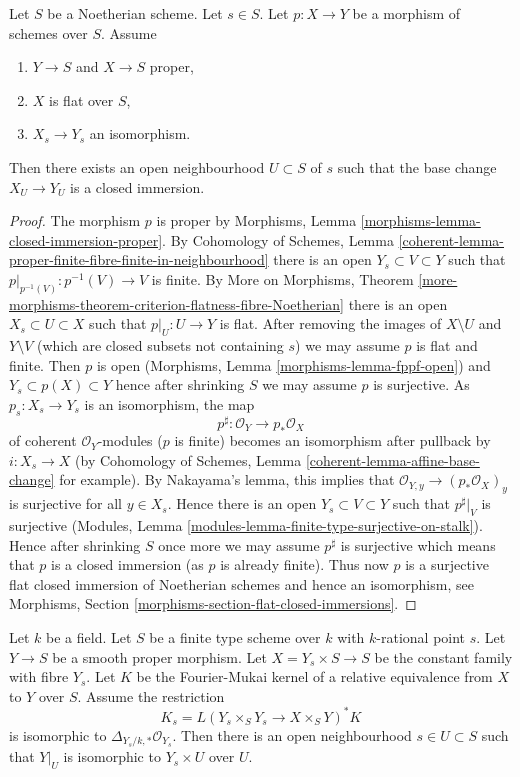 \begin{lemma}
\label{lemma-isomorphism-in-neighbourhood}
Let $S$ be a Noetherian scheme. Let $s \in S$.
Let $p : X \to Y$ be a morphism of schemes over $S$.
Assume
\begin{enumerate}
\item $Y \to S$ and $X \to S$ proper,
\item $X$ is flat over $S$,
\item $X_s \to Y_s$ an isomorphism.
\end{enumerate}
Then there exists an open neighbourhood $U \subset S$ of $s$
such that the base change $X_U \to Y_U$ is a closed immersion.
\end{lemma}

\begin{proof}
The morphism $p$ is proper by Morphisms, Lemma
\ref{morphisms-lemma-closed-immersion-proper}.
By Cohomology of Schemes, Lemma
\ref{coherent-lemma-proper-finite-fibre-finite-in-neighbourhood}
there is an open $Y_s \subset V \subset Y$ such that
$p|_{p^{-1}(V)} : p^{-1}(V) \to V$ is finite.
By More on Morphisms, Theorem
\ref{more-morphisms-theorem-criterion-flatness-fibre-Noetherian}
there is an open $X_s \subset U \subset X$ such that
$p|_U : U \to Y$ is flat. After removing the images of
$X \setminus U$ and $Y \setminus V$ (which are closed subsets
not containing $s$) we may assume $p$ is flat and finite.
Then $p$ is open (Morphisms, Lemma \ref{morphisms-lemma-fppf-open})
and $Y_s \subset p(X) \subset Y$ hence after shrinking $S$
we may assume $p$ is surjective.
As $p_s : X_s \to Y_s$ is an isomorphism, the map
$$
p^\sharp : \mathcal{O}_Y \longrightarrow p_*\mathcal{O}_X
$$
of coherent $\mathcal{O}_Y$-modules ($p$ is finite)
becomes an isomorphism after pullback by $i : X_s \to X$
(by Cohomology of Schemes, Lemma
\ref{coherent-lemma-affine-base-change} for example).
By Nakayama's lemma, this implies that
$\mathcal{O}_{Y, y} \to (p_*\mathcal{O}_X)_y$ is surjective
for all $y \in X_s$. Hence there is an open $Y_s \subset V \subset Y$
such that $p^\sharp|_V$ is surjective
(Modules, Lemma \ref{modules-lemma-finite-type-surjective-on-stalk}).
Hence after shrinking $S$ once more we may assume
$p^\sharp$ is surjective which means that $p$ is a closed
immersion (as $p$ is already finite).
Thus now $p$ is a surjective flat closed immersion
of Noetherian schemes and hence an isomorphism, see
Morphisms, Section \ref{morphisms-section-flat-closed-immersions}.
\end{proof}

\begin{lemma}
\label{lemma-no-deformations}
Let $k$ be a field. Let $S$ be a finite type scheme over $k$
with $k$-rational point $s$. Let $Y \to S$ be a smooth proper morphism.
Let $X = Y_s \times S \to S$ be the constant family with fibre
$Y_s$. Let $K$ be the Fourier-Mukai kernel of a relative equivalence
from $X$ to $Y$ over $S$. Assume the restriction
$$
K_s = L(Y_s \times_S Y_s \to X \times_S Y)^*K
$$
is isomorphic to $\Delta_{Y_s/k, *} \mathcal{O}_{Y_s}$.
Then there is an open neighbourhood $s \in U \subset S$
such that $Y|_U$ is isomorphic to $Y_s \times U$ over $U$.
\end{lemma}

